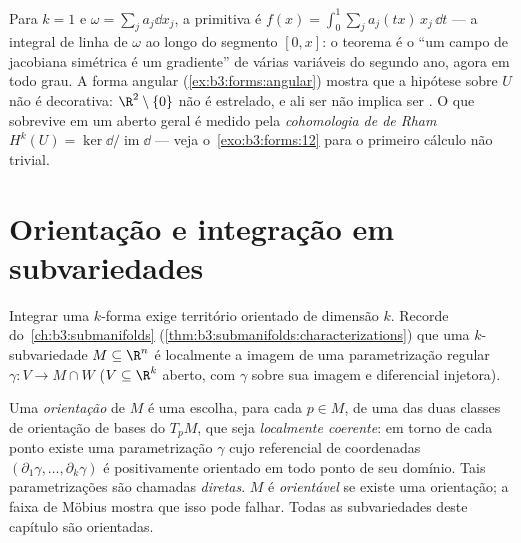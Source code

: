 \begin{remark}
Para $k = 1$ e $\omega = \sum_j a_j\dd x_j$, a primitiva é $f(x) = \int_0^1\sum_ja_j(tx)\,x_j\,\dd t$ --- a integral de linha de
$\omega$ ao longo do segmento $[0, x]$: o teorema é o ``um campo
de jacobiana simétrica é um gradiente'' de várias variáveis do segundo
ano, agora em todo grau. A forma angular (\cref{ex:b3:forms:angular}) mostra que a
hipótese sobre $U$ não é decorativa: $\R^2\setminus\{0\}$ não é estrelado, e ali ser
 não implica ser . O que sobrevive em um aberto geral é
medido pela \emph{cohomologia de de Rham} $H^k(U) =
\ker\dd/\operatorname{im}\dd$ --- veja
o~\cref{exo:b3:forms:12} para o primeiro cálculo não trivial.
\end{remark}

\section{Orientação e integração em subvariedades}

Integrar uma $k$-forma exige território orientado de dimensão
$k$. Recorde do~\cref{ch:b3:submanifolds} (\cref{thm:b3:submanifolds:characterizations}) que uma
$k$-subvariedade $M \subseteq \R^n$ é localmente a imagem de uma parametrização
regular $\gamma\colon V \to M \cap W$ ($V
\subseteq \R^k$ aberto, com $\gamma$  sobre sua
imagem e diferencial injetora).

\begin{definition}\label{def:b3:forms:orientation}
Uma \emph{orientação} de $M$ é uma escolha, para
cada $p \in M$, de uma das duas classes de orientação de bases do  $T_pM$, que seja \emph{localmente coerente}: em torno de
cada ponto existe uma parametrização $\gamma$ cujo referencial de
coordenadas $(\partial_1\gamma, \dots,
\partial_k\gamma)$ é positivamente orientado em todo ponto de seu
domínio. Tais parametrizações são chamadas \emph{diretas}. $M$ é
\emph{orientável} se existe uma orientação; a faixa de Möbius mostra que
isso pode falhar. Todas as subvariedades deste capítulo são orientadas.
\end{definition}

